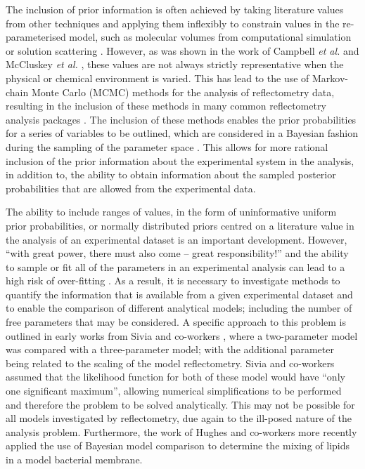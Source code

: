 \documentclass[
 reprint,
 superscriptaddress,
 amsmath,amssymb,
 aps,
]{revtex4-2}
\begin{document}
The inclusion of prior information is often achieved by taking literature values from other techniques and applying them inflexibly to constrain values in the re-parameterised model, such as molecular volumes from computational simulation or solution scattering \cite{sun_order_1994,armen_phospholipid_1998}. 
However, as was shown in the work of Campbell \emph{et al.} \cite{campbell_structure_2018} and McCluskey \emph{et al.} \cite{mccluskey_bayesian_2019}, these values are not always strictly representative when the physical or chemical environment is varied.
This has lead to the use of Markov-chain Monte Carlo (MCMC) methods for the analysis of reflectometry data, resulting in the inclusion of these methods in many common reflectometry analysis packages \cite{hughes_rascal_2017,kienzle_ncnr_2017,nelson_refnx_2019}.
The inclusion of these methods enables the prior probabilities for a series of variables to be outlined, which are considered in a Bayesian fashion during the sampling of the parameter space \cite{bayes_essay_1763,mccluskey_bayesian_2019}. 
This allows for more rational inclusion of the prior information about the experimental system in the analysis, in addition to, the ability to obtain information about the sampled posterior probabilities that are allowed from the experimental data. 

The ability to include ranges of values, in the form of uninformative uniform prior probabilities, or normally distributed priors centred on a literature value in the analysis of an experimental dataset is an important development. 
However, ``with great power, there must also come -- great responsibility!'' \cite{lee_introducting_1962} and the ability to sample or fit all of the parameters in an experimental analysis can lead to a high risk of over-fitting \cite{mayer_drawing_2010}. 
As a result, it is necessary to investigate methods to quantify the information that is available from a given experimental dataset and to enable the comparison of different analytical models; including the number of free parameters that may be considered. 
A specific approach to this problem is outlined in early works from Sivia and co-workers \cite{sivia_analysis_1991,geoghegan_experimental_1996,sivia_bayesian_1998}, where a two-parameter model was compared with a three-parameter model; with the additional parameter being related to the scaling of the model reflectometry. 
Sivia and co-workers assumed that the likelihood function for both of these model would have ``only one significant maximum'', allowing numerical simplifications to be performed and therefore the problem to be solved analytically. 
This may not be possible for all models investigated by reflectometry, due again to the ill-posed nature of the analysis problem. 
Furthermore, the work of Hughes and co-workers \cite{hughes_physical_2019} more recently applied the use of Bayesian model comparison to determine the mixing of lipids in a model bacterial membrane.
\end{document}
